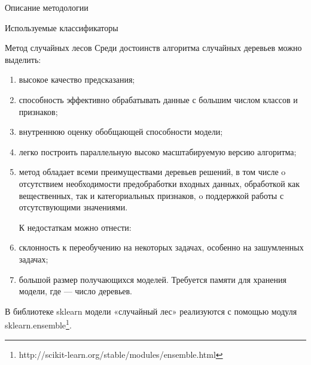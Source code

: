 \begin{section}{Описание методологии}
\begin{subsection}{Используемые классификаторы}
\begin{subsubsection}{Метод случайных лесов}
Среди достоинств алгоритма случайных деревьев можно выделить:
\begin{enumerate}
  \item высокое качество предсказания;
  \item способность эффективно обрабатывать данные с большим числом классов и признаков;
  \item внутреннюю оценку обобщающей способности модели;
  \item	легко построить параллельную высоко масштабируемую версию алгоритма;
  \item	метод обладает всеми преимуществами деревьев решений, в том числе
  o	отсутствием необходимости предобработки входных данных, обработкой как вещественных, так и категориальных признаков,
  o	поддержкой работы с отсутствующими значениями.

  К недостаткам можно отнести:
  \item	склонность к переобучению на некоторых задачах, особенно на зашумленных задачах;
  \item	большой размер получающихся моделей. Требуется  памяти для хранения модели, где  — число деревьев.
\end{enumerate}

В библиотеке sklearn модели «случайный лес»  реализуются с помощью модуля sklearn.ensemble\footnote{http://scikit-learn.org/stable/modules/ensemble.html}.
    \end{subsubsection}

  \end{subsection}

\end{section}
